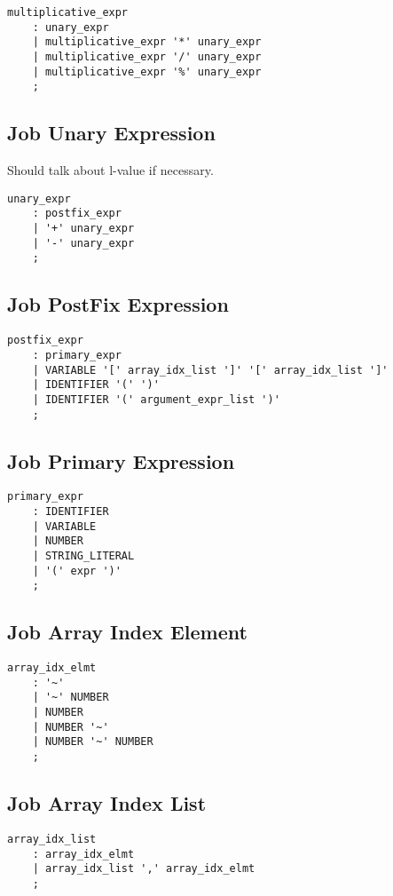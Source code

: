 \documentclass[prodmode,acmtecs]{acmsmall}
\begin{document}
\begin{lstlisting}
multiplicative_expr
	: unary_expr
	| multiplicative_expr '*' unary_expr
	| multiplicative_expr '/' unary_expr
	| multiplicative_expr '%' unary_expr
	;
\end{lstlisting}

\subsection{Job Unary Expression}
Should talk about l-value if necessary.

\begin{lstlisting}
unary_expr
	: postfix_expr
	| '+' unary_expr
	| '-' unary_expr
	;
\end{lstlisting}

\subsection{Job PostFix Expression}

\begin{lstlisting}
postfix_expr
	: primary_expr
	| VARIABLE '[' array_idx_list ']' '[' array_idx_list ']'
	| IDENTIFIER '(' ')'
	| IDENTIFIER '(' argument_expr_list ')'
	;
\end{lstlisting}

\subsection{Job Primary Expression}

\begin{lstlisting}
primary_expr
	: IDENTIFIER
	| VARIABLE
	| NUMBER
	| STRING_LITERAL
	| '(' expr ')'
	;
\end{lstlisting}

\subsection{Job Array Index Element}

\begin{lstlisting}
array_idx_elmt
	: '~'
	| '~' NUMBER
	| NUMBER
	| NUMBER '~'
	| NUMBER '~' NUMBER
	;
\end{lstlisting}

\subsection{Job Array Index List}

\begin{lstlisting}
array_idx_list
	: array_idx_elmt
	| array_idx_list ',' array_idx_elmt
	;
\end{lstlisting}
\end{document}
